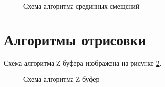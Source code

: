 \begin{figure}[ph!]
	\caption{Схема алгоритма срединных смещений}
	\label{fig:brown_mov_alg}
\end{figure}

\clearpage

\section{Алгоритмы отрисовки}

Схема алгоритма Z-буфера изображена на рисунке \ref{fig:z_buf_alg}.

\begin{figure}[ph!]
	\caption{Схема алгоритма Z-буфер}
	\label{fig:z_buf_alg}
\end{figure}

